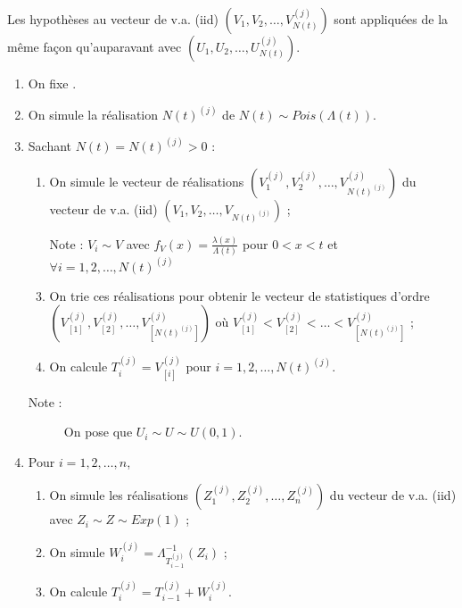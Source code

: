 \documentclass[10pt, french]{article}
\begin{document}
\begin{multicols*}{2}
Les hypothèses au vecteur de v.a. (iid) $\left(V_{1}, V_{2}, \dots, V_{N(t)}^{(j)}\right)$ sont appliquées de la même façon qu'auparavant avec $\left(U_{1}, U_{2}, \dots, U_{N(t)}^{(j)}\right)$.

\begin{algo2}
\begin{enumerate}
	\item	On fixe .
	\item	On simule la réalisation $N(t)^{(j)}$ de $N(t) \sim Pois(\Lambda(t))$.
	\item	Sachant $N(t)	=	N(t)^{(j)}	>	0$ :
		\begin{enumerate}[label = \alph*)]
		\item	On simule le vecteur de réalisations $\left( V_{1}^{(j)}, V_{2}^{(j)}, \dots, V_{N(t)^{(j)}}^{(j)}\right)$ du vecteur de v.a. (iid) $\left( V_{1}, V_{2}, \dots, V_{N(t)^{(j)}}\right)$ ;
		\item[Note :]	$V_{i} \sim V$ avec $f_{V}(x)	=	\frac{\lambda(x)}{\Lambda(t)}$ pour $0 < x < t$ et $\forall	i	=	1, 2, \dots, N(t)^{(j)}$
		\item	On trie ces réalisations pour obtenir le vecteur de statistiques d'ordre $\left( V_{[1]}^{(j)}, V_{[2]}^{(j)}, \dots, V_{[N(t)^{(j)}]}^{(j)}\right)$ où $ V_{[1]}^{(j)} < V_{[2]}^{(j)}< \dots < V_{[N(t)^{(j)}]}^{(j)}$ ;
		\item	On calcule $T_{i}^{(j)}	=	V_{[i]}^{(j)}$ pour $i	=	1, 2, \dots, N(t)^{(j)}$.
		\end{enumerate}
		\begin{description}
		\item[Note :]	On pose que $U_{i} \sim U \sim U(0, 1)$.
		\end{description}
	\item	Pour $i	=	1, 2, \dots, n$, 
		\begin{enumerate}[label = \alph*)]
		\item	On simule les réalisations $\left( Z_{1}^{(j)}, Z_{2}^{(j)}, \dots, Z_{n}^{(j)}\right)$ du vecteur de v.a. (iid) avec $Z_{i} \sim Z \sim Exp(1)$ ;
		\item	On simule $W_{i}^{(j)}	=	\Lambda^{-1}_{T_{i - 1}^{(j)}}(Z_{i})$ ;
		\item	On calcule $T_{i}^{(j)}	=	T_{i - 1}^{(j)} + W_{i}^{(j)}$.
		\end{enumerate}
\end{enumerate}

\tcbline


\end{algo2}
\end{multicols*}
\end{document}
